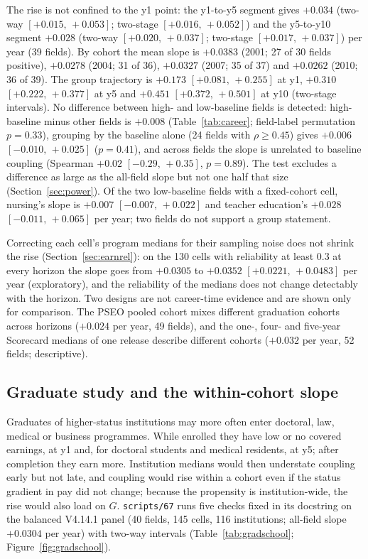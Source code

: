 \documentclass[11pt]{article}
\newcommand{\ci}[2]{$[#1,\allowbreak\,#2]$}
\newcommand{\scr}[1]{\texttt{scripts/#1}}
\begin{document}
The rise is not confined to the y1 point: the y1-to-y5 segment gives $+0.034$ (two-way \ci{+0.015}{+0.053};
two-stage \ci{+0.016}{+0.052}) and the y5-to-y10 segment $+0.028$ (two-way \ci{+0.020}{+0.037}; two-stage
\ci{+0.017}{+0.037}) per year (39 fields). By cohort the mean slope is $+0.0383$ (2001; 27
of 30 fields positive), $+0.0278$ (2004; 31 of 36), $+0.0327$ (2007; 35 of 37) and $+0.0262$ (2010; 36 of 39). The
group trajectory is $+0.173$ \ci{+0.081}{+0.255} at y1, $+0.310$ \ci{+0.222}{+0.377} at y5 and $+0.451$ \ci{+0.372}{+0.501} at
y10 (two-stage intervals). No difference between high- and low-baseline fields is detected: high-baseline minus
other fields is $+0.008$ (Table~\ref{tab:career}; field-label permutation $p=0.33$), grouping by the baseline alone
(24 fields with $\rho\ge0.45$) gives $+0.006$ \ci{-0.010}{+0.025} ($p=0.41$), and across fields the slope is unrelated
to baseline coupling (Spearman $+0.02$ \ci{-0.29}{+0.35}, $p=0.89$). The test excludes a difference as large as the
all-field slope but not one half that size (Section~\ref{sec:power}). Of the two low-baseline fields with a fixed-cohort cell, nursing's slope is $+0.007$
\ci{-0.007}{+0.022} and teacher education's $+0.028$ \ci{-0.011}{+0.065} per year; two fields do not support a group
statement.

Correcting each cell's program medians for their sampling noise does not shrink the rise
(Section~\ref{sec:earnrel}): on the 130 cells with reliability at least 0.3 at every horizon the slope goes from
$+0.0305$ to $+0.0352$ \ci{+0.0221}{+0.0483} per year (exploratory), and the reliability of the medians does not
change detectably with the horizon. Two designs are not career-time evidence and are shown only for comparison. The PSEO pooled cohort mixes different
graduation cohorts across horizons ($+0.024$ per year, 49 fields), and the one-, four- and five-year Scorecard
medians of one release describe different cohorts ($+0.032$ per year, 52 fields; descriptive).

\subsection{Graduate study and the within-cohort slope}\label{sec:gradshare}

Graduates of higher-status institutions may more often enter doctoral, law, medical or business programmes. While
enrolled they have low or no covered earnings, at y1 and, for doctoral students and medical residents, at y5; after
completion they earn more. Institution medians would then understate coupling early but not late, and coupling
would rise within a cohort even if the status gradient in pay did not change; because the propensity is
institution-wide, the rise would also load on $G$. \scr{67} runs five checks fixed in its docstring on the balanced
V4.14.1 panel (40 fields, 145 cells, 116 institutions; all-field slope $+0.0304$ per year) with two-way intervals
(Table~\ref{tab:gradschool}; Figure~\ref{fig:gradschool}).
\end{document}
